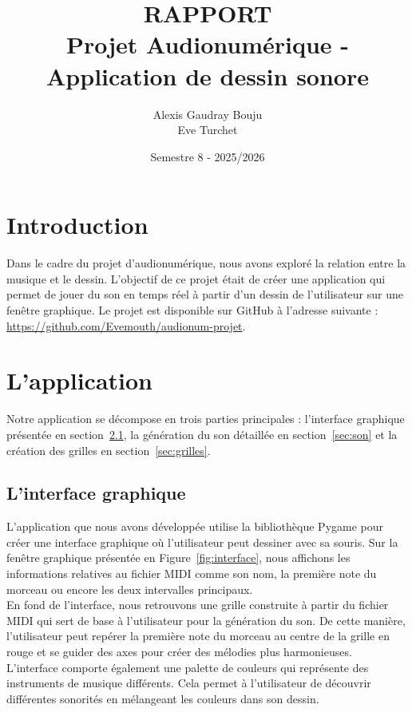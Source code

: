 \documentclass[11pt,a4paper]{article}
\title{RAPPORT \\ Projet Audionumérique - Application de dessin sonore}
\author{Alexis Gaudray Bouju \\ Eve Turchet}
\date{Semestre 8 - 2025/2026}
\begin{document}
\maketitle
\renewcommand{\contentsname}{Table des matières}
\tableofcontents
\newpage

\section{Introduction}

Dans le cadre du projet d'audionumérique, nous avons exploré la relation entre la musique et le dessin.
L'objectif de ce projet était de créer une application qui permet de jouer du son en temps réel à partir d'un dessin de l'utilisateur sur une fenêtre graphique.
Le projet est disponible sur GitHub à l'adresse suivante : \url{https://github.com/Evemouth/audionum-projet}.

\section{L'application}

Notre application se décompose en trois parties principales : l'interface graphique présentée en section~\ref{sec:interface}, la génération du son détaillée en section~\ref{sec:son} et la création des grilles en section~\ref{sec:grilles}.

\subsection{L'interface graphique}
\label{sec:interface}

L'application que nous avons développée utilise la bibliothèque Pygame pour créer une interface graphique où l'utilisateur peut dessiner avec sa souris.
Sur la fenêtre graphique présentée en Figure~\ref{fig:interface}, nous affichons les informations relatives au fichier MIDI comme son nom, la première note du morceau ou encore les deux intervalles principaux. \\

En fond de l'interface, nous retrouvons une grille construite à partir du fichier MIDI qui sert de base à l'utilisateur pour la génération du son.
De cette manière, l'utilisateur peut repérer la première note du morceau au centre de la grille en rouge et se guider des axes pour créer des mélodies plus harmonieuses.\\

L'interface comporte également une palette de couleurs qui représente des instruments de musique différents.
Cela permet à l'utilisateur de découvrir différentes sonorités en mélangeant les couleurs dans son dessin.\\
\end{document}
